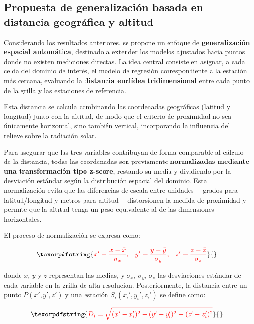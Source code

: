 \documentclass[letterpaper,12pt, twoside]{report}
\providecommand{\DIFdeltex}[1]{{\protect\color{red} \scriptsize #1}} %
\providecommand{\DIFdel}[1]{\texorpdfstring{\DIFdeltex{#1}}{}} %
\begin{document}
\subsection*{\DIFdel{Propuesta de generalización basada en distancia geográfica y altitud}}

\DIFdel{Considerando los resultados anteriores, se propone un enfoque de \textbf{generalización espacial automática}, destinado a extender los modelos ajustados hacia puntos donde no existen mediciones directas. La idea central consiste en asignar, a cada celda del dominio de interés, el modelo de regresión correspondiente a la estación más cercana, evaluando la \textbf{distancia euclídea tridimensional} entre cada punto de la grilla y las estaciones de referencia. 
}%

\DIFdel{Esta distancia se calcula combinando las coordenadas geográficas (latitud y longitud) junto con la altitud, de modo que el criterio de proximidad no sea únicamente horizontal, sino también vertical, incorporando la influencia del relieve sobre la radiación solar. 
}%

\DIFdel{Para asegurar que las tres variables contribuyan de forma comparable al cálculo de la distancia, todas las coordenadas son previamente \textbf{normalizadas mediante una transformación tipo z-score}, restando su media y dividiendo por la desviación estándar según la distribución espacial del dominio. Esta normalización evita que las diferencias de escala entre unidades —grados para latitud/longitud y metros para altitud— distorsionen la medida de proximidad y permite que la altitud tenga un peso equivalente al de las dimensiones horizontales. 
}%

\DIFdel{El proceso de normalización se expresa como:
}%

\[
\DIFdel{x' = \frac{x - \bar{x}}{\sigma_x}, \quad
y' = \frac{y - \bar{y}}{\sigma_y}, \quad
z' = \frac{z - \bar{z}}{\sigma_z}
}\]%

\DIFdel{donde $\bar{x}$, $\bar{y}$ y $\bar{z}$ representan las medias, y $\sigma_x$, $\sigma_y$, $\sigma_z$ las desviaciones estándar de cada variable en la grilla de alta resolución. Posteriormente, la distancia entre un punto $P(x', y', z')$ y una estación $S_i(x_i', y_i', z_i')$ se define como:
}%

\[
\DIFdel{D_i = \sqrt{(x' - x_i')^2 + (y' - y_i')^2 + (z' - z_i')^2}
}\]%
\end{document}
